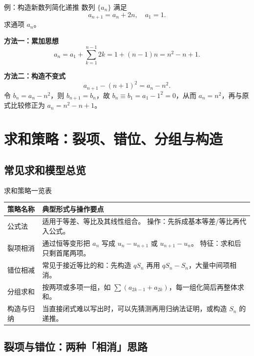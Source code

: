 \documentclass[a4paper,11pt]{ctexart}
\begin{document}
\begin{examplebox}{例：构造新数列简化递推}
  数列 $\{a_n\}$ 满足
  \[
    a_{n+1}=a_n+2n,\quad a_1=1.
  \]
  求通项 $a_n$。

  \textbf{方法一：累加思想}
  \[
    a_n=a_1+\sum_{k=1}^{n-1}2k=1+(n-1)n=n^2-n+1.
  \]

  \textbf{方法二：构造不变式}
  \[
    a_{n+1}- (n+1)^2 = a_n-n^2.
  \]
  令 $b_n=a_n-n^2$，则 $b_{n+1}=b_n$，故 $b_n\equiv b_1=a_1-1^2=0$，从而 $a_n=n^2$，再与原式比较修正为 $a_n=n^2-n+1$。
\end{examplebox}

\clearpage
\section{求和策略：裂项、错位、分组与构造}

\subsection{常见求和模型总览}

\begin{summarybox}{求和策略一览表}
  \begin{center}
  \begin{tabularx}{0.98\textwidth}{>{\raggedright\arraybackslash}p{3.2cm}X}
    \toprule
    \textbf{策略名称} & \textbf{典型形式与操作要点} \\
    \midrule
    公式法 &
      适用于等差、等比及其线性组合。\newline
      操作：先拆成基本等差/等比再代入公式。 \\
    裂项相消 &
      通过恒等变形把 $a_n$ 写成 $u_n-u_{n+1}$ 或 $u_{n+1}-u_n$。\newline
      特征：求和后只剩首尾两项。 \\
    错位相减 &
      常见于接近等比的和：先构造 $qS_n$ 再用 $qS_n-S_n$，大量中间项相消。 \\
    分组求和 &
      按两项或多项一组，如 $\sum (a_{2k-1}+a_{2k})$，每一组化简后再整体求和。 \\
    构造与归纳 &
      当直接闭式难以写出时，可以先猜测再用归纳法证明，或构造 $S_n$ 的递推。 \\
    \bottomrule
  \end{tabularx}
  \end{center}
\end{summarybox}

\subsection{裂项与错位：两种「相消」思路}
\end{document}
